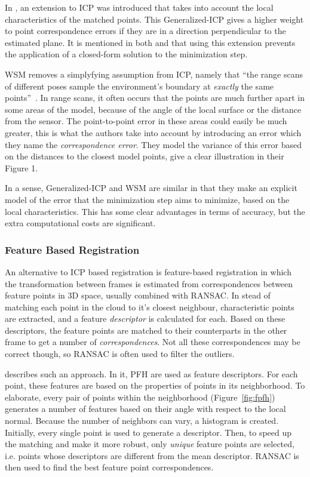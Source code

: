 \documentclass[a4paper]{article}
\begin{document}
In \cite{segal2009generalized}, an extension to \ac{ICP} was introduced that takes into account the local characteristics of the matched points. This Generalized-ICP gives a higher weight to point correspondence errors if they are in a direction perpendicular to the estimated plane. It is mentioned in both \cite{rusinkiewicz2001efficient} and \cite{segal2009generalized} that using this extension prevents the application of a closed-form solution to the minimization step.

\ac{WSM} removes a simplyfying assumption from \ac{ICP}, namely that ``the range scans of different poses sample the environment's boundary at \emph{exactly} the same points''~\cite{pfister2002weighted}. In range scans, it often occurs that the points are much further apart in some areas of the model, because of the angle of the local surface or the distance from the sensor. The point-to-point error in these areas could easily be much greater, this is what the authors take into account by introducing an error which they name the \emph{correspondence error}. They model the variance of this error based on the distances to the closest model points, \cite{slamet2008boosting} give a clear illustration in their Figure 1. 

In a sense, Generalized-ICP and \ac{WSM} are similar in that they make an explicit model of the error that the minimization step aims to minimize, based on the local characteristics. This has some clear advantages in terms of accuracy, but the extra computational costs are significant.

\subsubsection{Feature Based Registration}

An alternative to \ac{ICP} based registration is feature-based registration in which the transformation between frames is estimated from correspondences between feature points in 3D space, usually combined with \ac{RANSAC}. In stead of matching each point in the cloud to it's closest neighbour, characteristic points are extracted, and a feature \emph{descriptor} is calculated for each. Based on these descriptors, the feature points are matched to their counterparts in the other frame to get a number of \emph{correspondences}. Not all these correspondences may be correct though, so \ac{RANSAC} is often used to filter the outliers. 

\cite{rusu2009fast} describes such an approach. In it, \ac{PFH} are used as feature descriptors. For each point, these features are based on the properties of points in its neighborhood. To elaborate, every pair of points within the neighborhood (Figure~\ref{fig:fpfh}) generates a number of features based on their angle with respect to the local normal. Because the number of neighbors can vary, a histogram is created. Initially, every single point is used to generate a descriptor. Then, to speed up the matching and make it more robust, only \emph{unique} feature points are selected, i.e. points whose descriptors are different from the mean descriptor. \ac{RANSAC} is then used to find the best feature point correspondences.  
\end{document}
